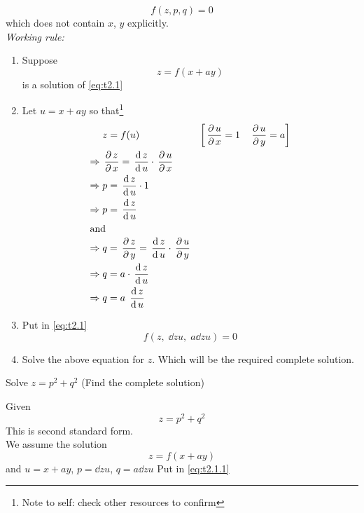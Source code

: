 \documentclass[../main-sheet.tex]{subfiles}
\begin{document}
\begin{enumerate}[label=\underline{Type - \Roman*}:]
        \begin{equation}
            f(z,p,q)=0\label{eq:t2.1}
        \end{equation}
        which does not contain \(x\), \(y\) explicitly.\\
        \emph{Working rule:}
        \begin{enumerate}[label=\arabic*]
            \item Suppose \begin{equation}
                z=f(x+ay)\label{eq:t2.2}
            \end{equation}
            is a solution of \eqref{eq:t2.1}
            \item Let \(u=x+ay\) so that\footnote{Note to self: check other resources to confirm} 
            \begin{align*}
                &z=f(u) &\left[\,\frac{\partial\, u}{\partial\, x}=1\quad\,\frac{\partial\, u}{\partial\, y}=a\right]\\
                \Rightarrow\; &\,\frac{\partial\, z}{\partial\, x}=\,\frac{\mathrm{d}\,z}{\mathrm{d}\, u}\cdot\,\frac{\partial\, u}{\partial\, x}\\
                \Rightarrow\; &p=\,\frac{\mathrm{d}\,z}{\mathrm{d}\, u}\cdot 1\\
                \Rightarrow\; &p=\,\frac{\mathrm{d}\,z}{\mathrm{d}\, u}\\
                \intertext{and}
                \Rightarrow\; &q=\,\frac{\partial\, z}{\partial\, y}=\,\frac{\mathrm{d}\,z}{\mathrm{d}\, u}\cdot \,\frac{\partial\, u}{\partial\, y}\\
                \Rightarrow\; &q=a\cdot\,\frac{\mathrm{d}\,z}{\mathrm{d}\, u}\\
                \Rightarrow\; &q=a\;\,\frac{\mathrm{d}\,z}{\mathrm{d}\, u}
            \end{align*}
            \item Put in \eqref{eq:t2.1} \[f\left(z,\;\dd{z}{u},\;a\dd{z}{u}\right)=0\]
            \item Solve the above equation for \(z\). Which will be the required complete solution.
        \end{enumerate}
        \begin{prob}
            Solve \(z=p^2+q^2\) (Find the complete solution)
        \end{prob}
        \begin{soln}
            Given
            \begin{equation}
                z=p^2+q^2 \label{eq:t2.1.1}
            \end{equation}
            This is second standard form.\\
            We assume the solution
            \[z=f(x+ay)\]
            and \(u=x+ay\), \(p=\displaystyle \dd{z}{u}\), \(q=\displaystyle a\dd{z}{u}\)
            Put in \eqref{eq:t2.1.1}

\end{soln}
\end{enumerate}
\end{document}
